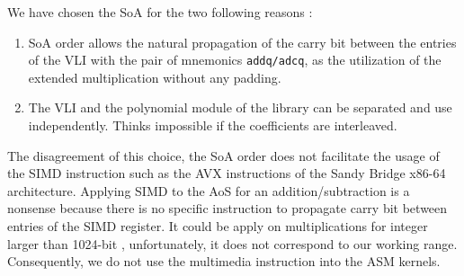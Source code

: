 \documentclass[oribibl]{llncs2e/llncs}
\begin{document}
We have chosen the SoA for the two following reasons :

\begin{enumerate}
\item SoA order allows the natural propagation of the carry bit between the entries of the VLI with the pair of mnemonics \texttt{addq/adcq}, as the utilization of the extended multiplication without any padding.  
\item The VLI and the polynomial module of the library can be separated and use independently. Thinks impossible if the coefficients are interleaved.
\end{enumerate}

The disagreement  of this choice, the SoA order does not facilitate the usage of the SIMD instruction such as the AVX instructions of the Sandy Bridge x86-64 architecture.
Applying SIMD to the AoS for an addition/subtraction is a nonsense because there is no specific instruction to propagate carry bit between entries of the SIMD register.
It could be  apply  on multiplications for integer  larger than 1024-bit \cite{SIMD}, unfortunately, it does not correspond to our working range. Consequently, we do not 
use the multimedia instruction into the ASM kernels.


\end{document}
